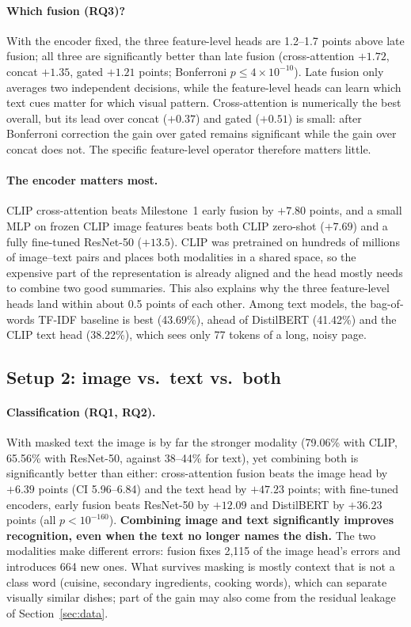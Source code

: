 \documentclass[11pt,a4paper]{article}
\begin{document}
\paragraph{Which fusion (RQ3)?}
With the encoder fixed, the three feature-level heads are 1.2--1.7 points above late fusion; all three are
significantly better than late fusion (cross-attention $+1.72$, concat $+1.35$, gated $+1.21$ points; Bonferroni
$p\leq4\times10^{-10}$). Late fusion only averages two independent decisions, while the
feature-level heads can learn which text cues matter for which visual pattern. Cross-attention is numerically the
best overall, but its lead over concat ($+0.37$) and gated ($+0.51$) is small: after Bonferroni correction the gain
over gated remains significant while the gain over concat does not. The specific feature-level operator therefore
matters little.

\paragraph{The encoder matters most.}
CLIP cross-attention beats Milestone~1 early fusion by $+7.80$ points, and a small MLP on frozen CLIP image
features beats both CLIP zero-shot ($+7.69$) and a fully fine-tuned ResNet-50 ($+13.5$). CLIP was pretrained on
hundreds of millions of image--text pairs and places both modalities in a shared space, so the expensive part of
the representation is already aligned and the head mostly needs to combine two good summaries. This also explains
why the three feature-level heads land within about 0.5 points of each other. Among text models, the bag-of-words
TF-IDF baseline is best (43.69\%), ahead of DistilBERT (41.42\%) and the CLIP text head (38.22\%), which sees only
77 tokens of a long, noisy page.

\subsection{Setup 2: image vs.\ text vs.\ both}

\paragraph{Classification (RQ1, RQ2).}
With masked text the image is by far the stronger modality (79.06\% with CLIP, 65.56\% with ResNet-50, against
38--44\% for text), yet combining both is significantly better than either: cross-attention fusion beats the image
head by $+6.39$ points (CI 5.96--6.84) and the text head by $+47.23$ points; with fine-tuned encoders, early fusion
beats ResNet-50 by $+12.09$ and DistilBERT by $+36.23$ points (all $p<10^{-160}$). \textbf{Combining image and text
significantly improves recognition, even when the text no longer names the dish.} The two modalities make different
errors: fusion fixes 2,115 of the image head's errors and introduces 664 new ones. What survives masking is mostly
context that is not a class word (cuisine, secondary ingredients, cooking words), which can separate visually
similar dishes; part of the gain may also come from the residual leakage of Section~\ref{sec:data}.
\end{document}
